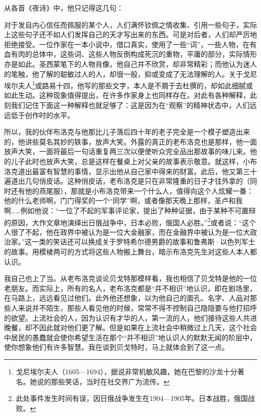 \par 从各首《夜诗》中，他只记得这几句：
\par 对于发自内心信任而佩服的某个人，人们满怀钦佩之情收集、引用一些句子，实际上这些句子还不如人们发挥自己的天才写出来的东西。可是对后者，人们却严厉地拒绝接受。一位作家在一本小说中，借口真实，使用了一些“词”，一些人物，在有血有肉的总体中，这些词、这些人物反倒构成死沉的重物，平庸的部分，实际情形亦是如此。圣西蒙笔下的人物肖像，他自己并不欣赏，却非常精彩；而他认为迷人的笔触，他了解的聪敏过人的人，却很一般，抑或变成了无法理解的人。关于戈尼埃尔夫人\footnote{戈尼埃尔夫人（1605—1694），据说非常机敏风趣，她在巴黎的沙龙十分著名。她说的那些笑话，当时在社交界广为流传。}或路易十四，他写的那些文字，本人是不屑于去杜撰的，却如此细腻或如此生动。这种现象值得提出，在许多作家身上也同样存在。对此有各种解释，此刻我们记住下面这一种解释也就足够了：这是因为在“观察”的精神状态中，人们远远低于创作时的水平。
\par 所以，我的伙伴布洛克与他那比儿子落后四十年的老子完全是一个模子塑造出来的，他讲些莫名其妙的轶事，放声大笑。外露的真正的老布洛克也是那样，他一面放声大笑，一面将最后一句话重复两三次以便使听众完全品出那故事的味儿来。他的儿子此时也放声大笑，总是这样在餐桌上对父亲的故事表示敬意。就这样，小布洛克道出最富有智慧的事情，显示出他从自己家中得来的财富。此后，他又第三十遍道出几句俏皮话。这种俏皮话，老布洛克是只在非常隆重的日子才往外拿的（同时还有他的燕尾服），那就是小布洛克带来一个什么人，值得向这个人炫耀一番：他的什么老师啊，门门得奖的一个“同学”啊，或者像那天晚上那样，圣卢和我啊……例如他说：“一位了不起的军事评论家，提出了种种证据，由于某种不可置辩的原因，大作文章地演绎出日俄战争中，日本必败，俄国人必胜。”\footnote{此处事件发生时间有误，因日俄战争发生在1904—1905年。日本战胜，俄国战败。}或者说：“这个人很了不起，他在政界中被认为是一位大金融家，而在金融界中被认为是一位大政治家。”这一类的笑话还可以换成关于罗特希尔德男爵的故事和鲁弗斯·以色列军士的故事。用模棱两可的方式将这些人物搬上舞台，暗示布洛克先生对这些人本人都认识。
\par 我自己也上了当。从老布洛克谈论贝戈特那模样看，我也相信了贝戈特是他的一位老朋友。而实际上，所有的名人，老布洛克都是“并不相识”地认识，即在剧场里，在马路上，远远看见过他们。此外他还想象，以为他自己的面孔、名字、人品对那些人来说并不陌生，那些人看见他的时候，常常不得不控制自己隐隐要与他打招呼的欲望。上流社会的人，因为认识有才华的人，第一流的人，他们接待这些人共进晚餐，却不因此就对他们更了解。但是如果在上流社会中稍微过上几天，这个社会中居民的愚蠢就会使你希望生活在那个“并不相识”地认识人的默默无闻的阶层中，使你想象他们有许多智慧。我在谈到贝戈特时，马上就体会到了这一点。
